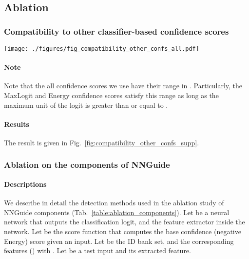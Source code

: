 \documentclass[10pt,twocolumn,letterpaper]{article}
\begin{document}
\subsection{Ablation}

\subsubsection{Compatibility to other classifier-based confidence scores}

\begin{figure*}[t]
\centering
\texttt{[image: ./figures/fig\_compatibility\_other\_confs\_all.pdf]}
\caption{
The compatibility to other classifier-based scores. The average performance across five different OODs is reported.
}
\label{fig:compatibility_other_confs_supp}
\end{figure*}

\paragraph{Note}
Note that the all confidence scores we use have their range in . Particularly, the MaxLogit and Energy confidence scores satisfy this range as long as the maximum unit of the logit is greater than or equal to .

\paragraph{Results}
The result is given in Fig.~\ref{fig:compatibility_other_confs_supp}.

\subsubsection{Ablation on the components of NNGuide}

\paragraph{Descriptions}
We describe in detail the detection methods used in the ablation study of NNGuide components (\ie Tab.~\ref{table:ablation_components}). Let  be a neural network that outputs the classification logit, and  the feature extractor inside the network. Let  be the score function that computes the base confidence (\ie negative Energy) score given an input. Let  be the ID bank set, and  the corresponding features (\ie ) with .
Let  be a test input and  its extracted feature.  
\end{document}
